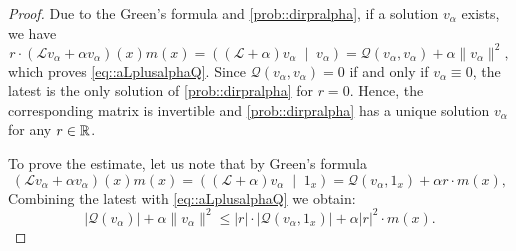 \documentclass[a4paper,11pt]{amsart}
\theoremstyle{definition}
\renewcommand{\L}{\mathcal{L}}
\begin{document}
\begin{proof}
Due to the Green's formula and \eqref{prob::dirpralpha}, if a solution $v_\alpha$ exists, we have 
$$
r\cdot (\L v_\alpha+\alpha v_\alpha)(x)m(x)= ((\L +\alpha)v_\alpha\;\mid\;v_\alpha)=\mathcal  Q(v_\alpha,v_\alpha)+\alpha \|v_\alpha\|^2,
$$
which proves \eqref{eq::aLplusalphaQ}.
Since $\mathcal  Q(v_\alpha,v_\alpha)=0$ if and only if $v_\alpha\equiv 0$, the latest is the only solution of \eqref{prob::dirpralpha}  for $r=0$. Hence, the corresponding matrix is invertible and \eqref{prob::dirpralpha} has a unique solution $v_\alpha$ for any $r\in \Bbb R$. 

To prove the estimate, let us note that by Green's formula
$$
 (\L v_\alpha+\alpha v_\alpha)(x)m(x)=((\L +\alpha)v_\alpha\;\mid\;1_x)=\mathcal  Q(v_\alpha,1_x)+\alpha r\cdot m(x),
$$
Combining the latest with \eqref{eq::aLplusalphaQ} we obtain:
\begin{equation}\label{eq::QvrQvr1}
|\mathcal Q(v_\alpha)|+\alpha \|v_\alpha\|^2\le |r|\cdot|\mathcal  Q(v_\alpha,1_x)|+\alpha|r|^2\cdot m(x).
\end{equation}



\end{proof}
\end{document}
